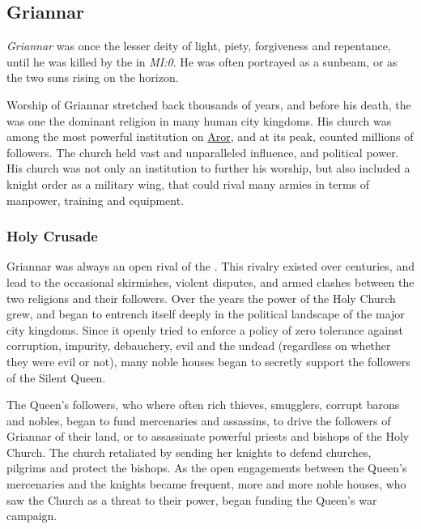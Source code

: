 \subsection{Griannar}
\label{sec:Griannar}

\emph{Griannar} was once the lesser deity of light, piety, forgiveness and
repentance, until he was killed by the  in
\emph{MI:0}. He was often portrayed as a sunbeam, or as the two suns rising on
the horizon.

Worship of Griannar stretched back thousands of years, and before his death,
the  was one the dominant religion in many
human city kingdoms. His church was among the most powerful institution on
\hyperref[sec:Aror]{Aror}, and at its peak, counted millions of followers.
The church held vast and unparalleled influence, and political power. His
church was not only an institution to further his worship, but also included a
knight order as a military wing, that could rival many armies in terms of
manpower, training and equipment.

\subsubsection{Holy Crusade}
\label{sec:Holy Crusade}

Griannar was always an open rival of the . This
rivalry existed over centuries, and lead to the occasional skirmishes, violent
disputes, and armed clashes between the two religions and their
followers. Over the years the power of the Holy Church grew, and began to
entrench itself deeply in the political landscape of the major city
kingdoms. Since it openly tried to enforce a policy of zero tolerance against
corruption, impurity, debauchery, evil and the undead (regardless on whether
they were evil or not), many noble houses began to secretly support the
followers of the Silent Queen.

The Queen's followers, who where often rich thieves, smugglers, corrupt barons
and nobles, began to fund mercenaries and assassins, to drive the followers of
Griannar of their land, or to assassinate powerful priests and bishops of the
Holy Church. The church retaliated by sending her knights to defend churches,
pilgrims and protect the bishops. As the open engagements between the Queen's
mercenaries and the knights became frequent, more and more noble houses, who
saw the Church as a threat to their power, began funding the Queen's war
campaign.

